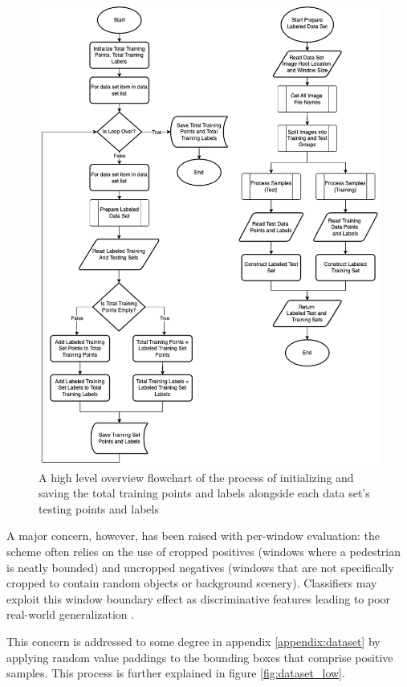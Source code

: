 \begin{figure}
    \centering
    \includegraphics[width=0.75\linewidth]{images/ee_dataset_high.drawio.png}
    \caption{A high level overview flowchart of the process of initializing and saving the total training points and labels alongside each data set's testing points and labels}
    \label{fig:dataset_high}
\end{figure}

A major concern, however, has been raised with per-window evaluation: the scheme often relies on the use of cropped positives (windows where a pedestrian is neatly bounded) and uncropped negatives (windows that are not specifically cropped to contain random objects or background scenery). Classifiers may exploit this window boundary effect as discriminative features leading to poor real-world generalization \cite{dollar_2009_pedestrian}.

This concern is addressed to some degree in appendix \ref{appendix:dataset} by applying random value paddings to the bounding boxes that comprise positive samples. This process is further explained in figure \ref{fig:dataset_low}.

